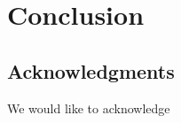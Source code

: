 \documentclass{article}
\begin{document}
\section{Conclusion}


\subsection{Acknowledgments} 

We would like to acknowledge 








\end{document}
